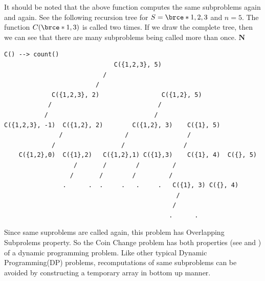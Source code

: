 It should be noted that the above function computes the same subproblems
again and again. See the following recursion tree for $S=\brce*{1,2,3}$ and
$n=5$. The function $C(\brce*{1}, 3)$ is called two times. If we draw the
complete tree, then we can see that there are many subproblems being called
more than once.  $\bm{N}$ 
\begin{lstlisting}[style=raygeneric]
C() --> count()
                              C({1,2,3}, 5)                     
                           /                
                         /                                 
             C({1,2,3}, 2)                 C({1,2}, 5)
            /                             /         
           /                             /           
C({1,2,3}, -1)  C({1,2}, 2)        C({1,2}, 3)    C({1}, 5)
               /                 /                /     
             /                  /                /       
    C({1,2},0)  C({1},2)   C({1,2},1) C({1},3)    C({1}, 4)  C({}, 5)
                   /       /        /         /         
                  /       /        /         /        
                .      .  .     .   .     .   C({1}, 3) C({}, 4)
                                               /  
                                              /      
                                             .      .
\end{lstlisting}
Since same suproblems are called again, this problem has Overlapping
Subprolems property. So the Coin Change problem has both properties (see
 and
) of a dynamic programming problem.
Like other typical Dynamic Programming(DP) problems, recomputations of same
subproblems can be avoided by constructing a temporary array 
in bottom up manner.


